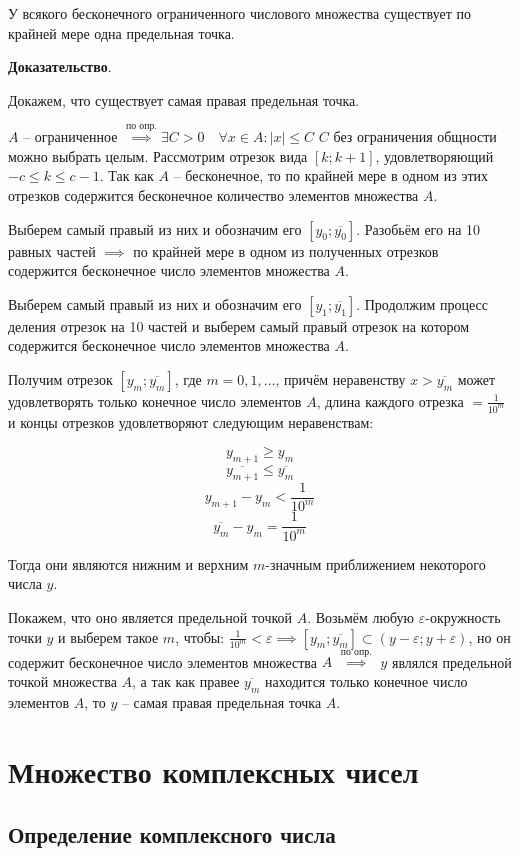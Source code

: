 \documentclass{article}
\begin{document}
У всякого бесконечного ограниченного числового множества существует по крайней мере
одна предельная точка.

\textbf{Доказательство}.

Докажем, что существует самая правая предельная точка.

$A$ -- ограниченное $\stackrel{\text{по опр.}}{\implies} \exists C > 0 \quad
\forall x \in A: |x| \le C$
$C$ без ограничения общности можно выбрать целым.
Рассмотрим отрезок вида $[k;k+1]$, удовлетворяющий $-c \le k \le c - 1$.
Так как $A$ -- бесконечное, то по крайней мере в одном из этих отрезков содержится
бесконечное количество элементов множества $A$.

Выберем самый правый из них и обозначим его $[y_0;\overline{y_0}]$.
Разобьём его на 10 равных частей $\implies$ по крайней мере в одном из
полученных отрезков содержится бесконечное число элементов множества $A$.

Выберем самый правый из них и обозначим его $[y_1;\overline{y_1}]$.
Продолжим процесс деления отрезок на 10 частей и выберем самый правый отрезок
на котором содержится бесконечное число элементов множества $A$.

Получим отрезок $[y_m;\overline{y_m}]$, где $m = 0,1,\dots$, причём неравенству
$x > \overline{y_m}$ может удовлетворять только конечное число элементов $A$,
длина каждого отрезка $= \frac{1}{10^m}$ и концы отрезков удовлетворяют
следующим неравенствам:

\[y_{m+1} \ge y_m\]
\[\overline{y_{m+1}} \le \overline{y_m}\]
\[y_{m+1} - y_m < \frac{1}{10^m}\]
\[\overline{y_m} - y_m = \frac{1}{10^m}\]

Тогда они являются нижним и верхним $m$-значным приближением некоторого числа $y$.

Покажем, что оно является предельной точкой $A$. Возьмём любую $\varepsilon$-окружность
точки $y$ и выберем такое $m$, чтобы: 
$\frac{1}{10^m} < \varepsilon \implies [y_m;\overline{y_m}] \subset 
(y - \varepsilon; y + \varepsilon)$, но он содержит бесконечное число элементов
множества $A$ $\stackrel{\text{по опр.}}{\implies}$ $y$ являлся предельной точкой
множества $A$, а так как правее $\overline{y_m}$ находится только конечное число
элементов $A$, то $y$ -- самая правая предельная точка $A$.

\section{Множество комплексных чисел}

\subsection{Определение комплексного числа}
\end{document}
